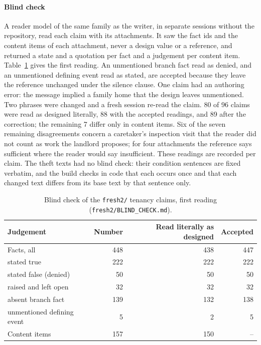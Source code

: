 \paragraph{Blind check}
A reader model of the same family as the writer, in separate sessions without the repository, read each claim with its attachments. It saw the fact ids and the content items of each attachment, never a design value or a reference, and returned a state and a quotation per fact and a judgement per content item. Table~\ref{tab:blindcheck} gives the first reading. An unmentioned branch fact read as denied, and an unmentioned defining event read as stated, are accepted because they leave the reference unchanged under the silence clause. One claim had an authoring error: the message implied a family home that the design leaves unmentioned. Two phrases were changed and a fresh session re-read the claim. 80 of 96 claims were read as designed literally, 88 with the accepted readings, and 89 after the correction; the remaining 7 differ only in content items. Six of the seven remaining disagreements concern a caretaker's inspection visit that the reader did not count as work the landlord proposes; for four attachments the reference says sufficient where the reader would say insufficient. These readings are recorded per claim. The theft texts had no blind check: their condition sentences are fixed verbatim, and the build checks in code that each occurs once and that each changed text differs from its base text by that sentence only.

\begin{table}[h]
\caption{Blind check of the \texttt{fresh2/} tenancy claims, first reading (\texttt{fresh2/\allowbreak{}BLIND\_CHECK.md}).}
\label{tab:blindcheck}
\footnotesize
\begin{tabular}{@{}lrrr@{}}
\toprule
Judgement & Number & Read literally as designed & Accepted \\
\midrule
Facts, all & 448 & 438 & 447 \\
\quad stated true & 222 & 222 & 222 \\
\quad stated false (denied) & 50 & 50 & 50 \\
\quad raised and left open & 32 & 32 & 32 \\
\quad absent branch fact & 139 & 132 & 138 \\
\quad unmentioned defining event & 5 & 2 & 5 \\
Content items & 157 & 150 & -- \\
\bottomrule
\end{tabular}
\end{table}

